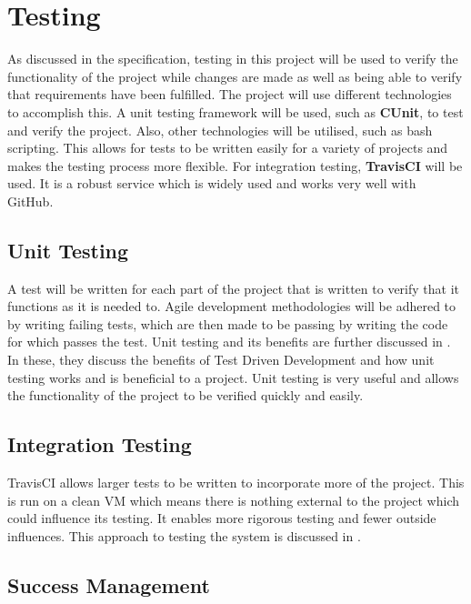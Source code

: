 \documentclass{report}
\begin{document}
\chapter{Testing}

As discussed in the specification, testing in this project will be used to verify the functionality of the project while changes are made as 
well as being able to verify that requirements have been fulfilled. The project will use different technologies to accomplish this. A unit testing framework will be used, such as \textbf{CUnit}, to test and verify the project. Also, other technologies will be utilised, such as bash scripting. This allows for tests to be written easily for a variety of projects and makes the testing process more flexible.
For integration testing, \textbf{TravisCI} will be used. It is a robust service which is widely used and works very well with GitHub.

\section{Unit Testing}

A test will be written for each part of the project that is written to verify that it functions as it is needed to. Agile development methodologies will be adhered to by writing failing tests, which are then made to be passing by writing the code for which passes the test. Unit testing and its benefits are further discussed in \cite{PressmanUnitIntegration, SommervilleTDD}. 
In these, they discuss the benefits of Test Driven Development and how unit testing works and is beneficial to a project. Unit testing is very useful and allows the functionality of the project to be verified quickly and easily.

\section{Integration Testing}

TravisCI allows larger tests to be written to incorporate more of the project. This is run on a clean VM which 
means there is nothing external to the project which could influence its testing. It enables more rigorous testing and fewer outside influences. This
approach to testing the system is discussed in \cite{PressmanUnitIntegration}.

\section{Success Management}
\end{document}
